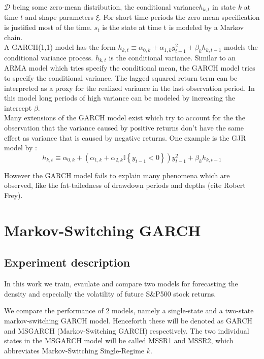 \documentclass[11pt,a4paper]{article}
\begin{document}
$\mathcal{D}$ being some zero-mean distribution, the conditional variance$h_{k,t}$ in state $k$ at time $t$ and shape parameters $\xi$. For short time-periods the zero-mean specification is justified most of the time.  $s_t$ is the state at time t is modeled by a Markov chain.\\

A GARCH(1,1) model has the form $h_{k, t} \equiv \alpha_{0, k}+\alpha_{1, k} y_{t-1}^{2}+\beta_{k} h_{k, t-1}$ models the conditional variance process. $h_{k,t}$ is the conditional variance. Similar to an \ac{ARMA} model which tries specify the conditional mean, the \ac{GARCH} model tries to specify the conditional variance. The lagged squared return term can be interpreted as a proxy for the realized variance in the last observation period. 
In this model long periods of high variance can be modeled by increasing the intercept $\beta$.\\

Many extensions of the GARCH model exist which try to account for the the observation that the variance caused by positive returns don't have the same effect as variance that is caused by negative returns. One example is the GJR model by \cite{glosten_relation_1993}: 
\begin{equation} \label{eq:GJR}
	h_{k, t} \equiv \alpha_{0, k}+\left(\alpha_{1, k}+\alpha_{2, k} \mathbb{I}\left\{y_{t-1}<0\right\}\right) y_{t-1}^2+\beta_k h_{k, t-1}
\end{equation}

However the GARCH model fails to explain many phenomena which are observed, like the fat-tailedness of drawdown periods and depths (cite Robert Frey).

\section{Markov-Switching GARCH}

\subsection{Experiment description}
In this work we train, evaulate and compare two models for forecasting the density and especially the volatility of future S\&P500 stock returns.

We compare the performance of 2 models, namely a single-state and a two-state markov-switching GARCH model. Henceforth these will be denoted as GARCH and MSGARCH (Markov-Switching GARCH) respectively. The two individual states in the MSGARCH model will be called MSSR1 and MSSR2, which abbreviates Markov-Switching Single-Regime $k$.
\end{document}
